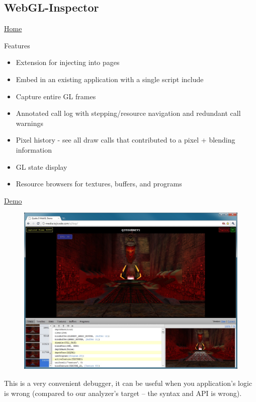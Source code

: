 \subsection{WebGL-Inspector}\label{webgl-inspector}

\href{https://benvanik.github.com/WebGL-Inspector/}{Home}

Features

\begin{itemize}
\tightlist
\item
  Extension for injecting into pages
\item
  Embed in an existing application with a single script include
\item
  Capture entire GL frames
\item
  Annotated call log with stepping/resource navigation and redundant
  call warnings
\item
  Pixel history - see all draw calls that contributed to a pixel +
  blending information
\item
  GL state display
\item
  Resource browsers for textures, buffers, and programs
\end{itemize}

\href{http://benvanik.github.io/WebGL-Inspector/samples/lesson05/embedded.html}{Demo}

\begin{figure}[htbp]
\centering
\includegraphics{inspector.jpg}
\caption{}
\end{figure}

This is a very convenient debugger, it can be useful when you
application's logic is wrong (compared to our analyzer's target -- the
syntax and API is wrong).

